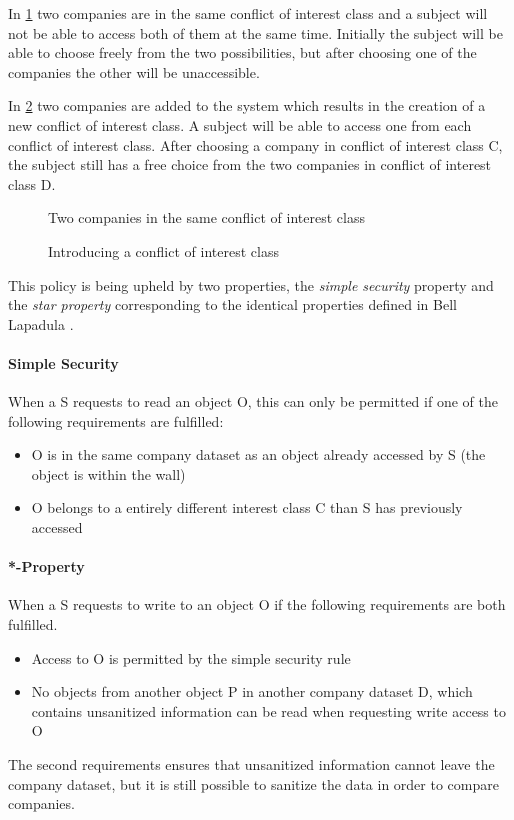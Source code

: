 In \cref{conflict} two companies are in the same conflict of interest class and a subject will not be able to access both of them at the same time.
Initially the subject will be able to choose freely from the two possibilities, but after choosing one of the companies the other will be unaccessible.

In \cref{conflict2} two companies are added to the system which results in the creation of a new conflict of interest class.
A subject will be able to access one from each conflict of interest class.
After choosing a company in conflict of interest class C, the subject still has a free choice from the two companies in conflict of interest class D.
\begin{figure}
  
  \caption{Two companies in the same conflict of interest class}
  \label{conflict}
\end{figure}

\begin{figure}
  
  \caption{Introducing a conflict of interest class}
  \label{conflict2}
\end{figure}
This policy is being upheld by two properties, the \emph{simple security} property and the \emph{star property} corresponding to the identical properties defined in Bell Lapadula .

\paragraph{Simple Security}

When a \principal{} S requests to read an object O, this can only be permitted if one of the following requirements are fulfilled:

\begin{itemize}
\item O is in the same company dataset as an object already accessed by S (the object is within the wall)
\item O belongs to a entirely different interest class C than S has previously accessed
\end{itemize}

\paragraph{*-Property}

When a \principal{} S requests to write to an object O if the following requirements are both fulfilled.

\begin{itemize}
\item Access to O is permitted by the simple security rule
\item No objects from another object P in another company dataset D, which contains unsanitized information can be read when requesting write access to O
\end{itemize}

The second requirements ensures that unsanitized information cannot leave the company dataset, but it is still possible to sanitize the data in order to compare companies.
